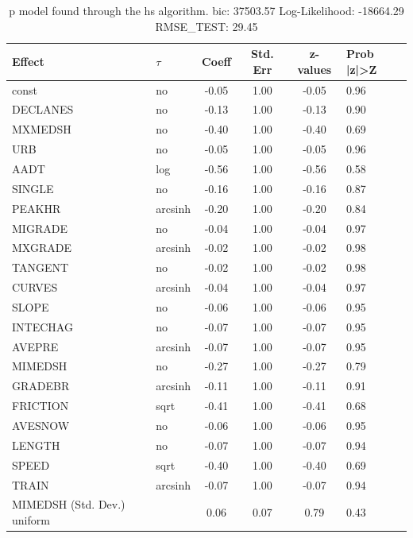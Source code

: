 \begin{table}
	\caption{p model found through the hs algorithm. bic: 37503.57 Log-Likelihood: -18664.29 RMSE_TEST: 29.45}
	\begin{center}
		\begin{tabular}{|l|l|c|c|c|l|}
			\hline
			Effect & $\tau$ & Coeff & Std. Err & z-values & Prob |z|>Z \\
			\hline
			const & no & -0.05 & 1.00 & -0.05 & 0.96 \\
			\hline
			DECLANES & no & -0.13 & 1.00 & -0.13 & 0.90 \\
			\hline
			MXMEDSH & no & -0.40 & 1.00 & -0.40 & 0.69 \\
			\hline
			URB & no & -0.05 & 1.00 & -0.05 & 0.96 \\
			\hline
			AADT & log & -0.56 & 1.00 & -0.56 & 0.58 \\
			\hline
			SINGLE & no & -0.16 & 1.00 & -0.16 & 0.87 \\
			\hline
			PEAKHR & arcsinh & -0.20 & 1.00 & -0.20 & 0.84 \\
			\hline
			MIGRADE & no & -0.04 & 1.00 & -0.04 & 0.97 \\
			\hline
			MXGRADE & arcsinh & -0.02 & 1.00 & -0.02 & 0.98 \\
			\hline
			TANGENT & no & -0.02 & 1.00 & -0.02 & 0.98 \\
			\hline
			CURVES & arcsinh & -0.04 & 1.00 & -0.04 & 0.97 \\
			\hline
			SLOPE & no & -0.06 & 1.00 & -0.06 & 0.95 \\
			\hline
			INTECHAG & no & -0.07 & 1.00 & -0.07 & 0.95 \\
			\hline
			AVEPRE & arcsinh & -0.07 & 1.00 & -0.07 & 0.95 \\
			\hline
			MIMEDSH & no & -0.27 & 1.00 & -0.27 & 0.79 \\
			\hline
			GRADEBR & arcsinh & -0.11 & 1.00 & -0.11 & 0.91 \\
			\hline
			FRICTION & sqrt & -0.41 & 1.00 & -0.41 & 0.68 \\
			\hline
			AVESNOW & no & -0.06 & 1.00 & -0.06 & 0.95 \\
			\hline
			LENGTH & no & -0.07 & 1.00 & -0.07 & 0.94 \\
			\hline
			SPEED & sqrt & -0.40 & 1.00 & -0.40 & 0.69 \\
			\hline
			TRAIN & arcsinh & -0.07 & 1.00 & -0.07 & 0.94 \\
			\hline
			MIMEDSH (Std. Dev.) uniform &  & 0.06 & 0.07 & 0.79 & 0.43 \\

\end{tabular}
\end{center}
\end{table}
